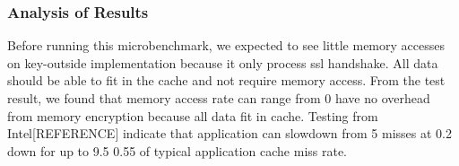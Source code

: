 \documentclass[../../../main.tex]{subfiles}
\begin{document}
\subsubsection*{Analysis of Results}
Before running this microbenchmark, we expected to see little memory
 accesses on key-outside implementation because it only process ssl
 handshake. All data should be able to fit in the cache and not require
 memory access. From the test result, we found that memory access rate can 
 range from 0%
 have no overhead from memory encryption because all data fit in cache. 
 Testing from Intel[REFERENCE] indicate that application can slowdown from 
 5%
 misses at 0.2%
 down for up to 9.5%
 0.55 of typical application cache miss rate.
\end{document}
